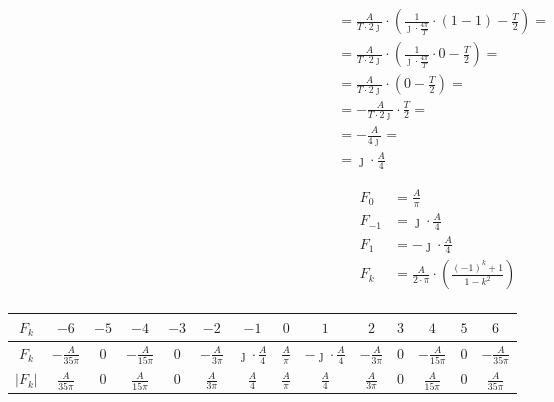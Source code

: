 \begin{task}
\begin{align*}
&=\frac{A}{T\cdot 2\jmath} \cdot \left( \frac{1}{\jmath \cdot \frac{4\pi}{T}} \cdot \left( 1 - 1\right) - \frac{T}{2}\right)=\\
&=\frac{A}{T\cdot 2\jmath} \cdot \left( \frac{1}{\jmath \cdot \frac{4\pi}{T}} \cdot 0 - \frac{T}{2}\right)=\\
&=\frac{A}{T\cdot 2\jmath} \cdot \left( 0 - \frac{T}{2}\right)=\\
&=-\frac{A}{T\cdot 2\jmath} \cdot \frac{T}{2} =\\
&=-\frac{A}{4 \jmath} =\\
&=\jmath \cdot \frac{A}{4} 
\end{align*}



\begin{align*}
F_0&=\frac{A}{\pi}\\
F_{-1}&=\jmath \cdot \frac{A}{4}\\
F_{1}&=-\jmath \cdot \frac{A}{4}\\
F_k&=\frac{A}{2 \cdot \pi} \cdot \left(\frac{(-1)^{k}+1}{1-k^2}\right)\\
\end{align*}


\begin{table}[H]
  \centering  
  \begin{tabular}{|c|c|c|c|c|c|c|c|c|c|c|c|c|c|}
    \hline 
    $F_k$ & $-6$ & $-5$ & $-4$ & $-3$ & $-2$ & $-1$ & $0$& $1$& $2$& $3$& $4$& $5$ & $6$\\ 
    \hline 
    $F_k$ & $-\frac{A}{35\pi}$ & $0$ & $-\frac{A}{15\pi}$ & $0$ & $-\frac{A}{3\pi}$ & $\jmath \cdot \frac{A}{4}$ & $\frac{A}{\pi}$ & $-\jmath \cdot \frac{A}{4}$ & $-\frac{A}{3\pi}$ & $0$ & $-\frac{A}{15\pi}$ & $0$ & $-\frac{A}{35\pi}$\\ 
    \hline 
    $\left|F_k\right|$ & $\frac{A}{35\pi}$ & $0$ & $\frac{A}{15\pi}$ & $0$ & $\frac{A}{3\pi}$ & $\frac{A}{4}$ & $\frac{A}{\pi}$ & $\frac{A}{4}$ & $\frac{A}{3\pi}$ & $0$ & $\frac{A}{15\pi}$ & $0$ & $\frac{A}{35\pi}$\\ 
    \hline 
  \end{tabular} 
\end{table}


\end{task}
